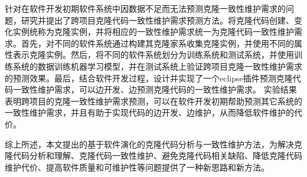 {针对在软件开发初期软件系统中因数据不足而无法预测克隆一致性维护需求的问题，研究并提出了跨项目克隆代码一致性维护需求预测方法。将克隆代码创建、变化实例统称为克隆实例，并将相应的一致性维护需求统一为克隆代码一致性维护需求。首先，对不同的软件系统通过构建其克隆家系收集克隆实例，并使用不同的属性表示克隆实例。然后，将不同的软件系统划分为训练系统和测试系统，并使用训练系统的数据训练机器学习模型，并在测试系统上验证跨项目克隆一致性维护需求的预测效果。最后，结合软件开发过程，设计并实现了一个eclipse插件预测克隆代码一致性维护需求，可以边开发、边预测克隆代码的一致性维护需求。 实验结果表明跨项目的克隆一致性维护需求预测，可以在软件开发初期帮助预测其它系统的一致性维护需求，并且有助于实现代码的边开发、边维护，从而降低软件维护的代价。%

综上所述，本文提出的基于软件演化的克隆代码分析与一致性维护方法，为解决克隆代码分析和理解、克隆代码一致性维护、避免克隆代码相关缺陷、降低克隆代码维护代价、提高软件质量和可维护性等问题提供了一种新思路和新方法。
}


